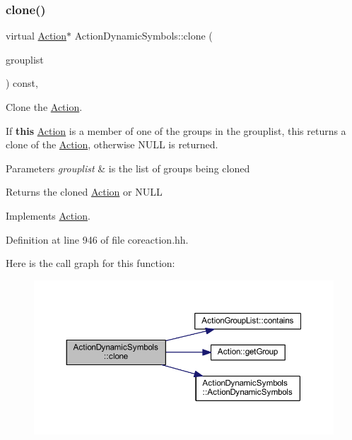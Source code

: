 \subsubsection{\texorpdfstring{clone()}{clone()}}
{\footnotesize\ttfamily virtual \mbox{\hyperlink{class_action}{Action}}$\ast$ Action\+Dynamic\+Symbols\+::clone (\begin{DoxyParamCaption}\item[{const \mbox{\hyperlink{class_action_group_list}{Action\+Group\+List}} \&}]{grouplist }\end{DoxyParamCaption}) const\hspace{0.3cm}{\ttfamily [inline]}, {\ttfamily [virtual]}}



Clone the \mbox{\hyperlink{class_action}{Action}}. 

If {\bfseries{this}} \mbox{\hyperlink{class_action}{Action}} is a member of one of the groups in the grouplist, this returns a clone of the \mbox{\hyperlink{class_action}{Action}}, otherwise N\+U\+LL is returned. 
\begin{DoxyParams}{Parameters}
{\em grouplist} & is the list of groups being cloned \\
\hline
\end{DoxyParams}
\begin{DoxyReturn}{Returns}
the cloned \mbox{\hyperlink{class_action}{Action}} or N\+U\+LL 
\end{DoxyReturn}


Implements \mbox{\hyperlink{class_action_af8242e41d09e5df52f97df9e65cc626f}{Action}}.



Definition at line 946 of file coreaction.\+hh.

Here is the call graph for this function\+:
\nopagebreak
\begin{figure}[H]
\begin{center}
\leavevmode
\includegraphics[width=350pt]{class_action_dynamic_symbols_aff1299c36f20a83a2efd54768e58abeb_cgraph}
\end{center}
\end{figure}


